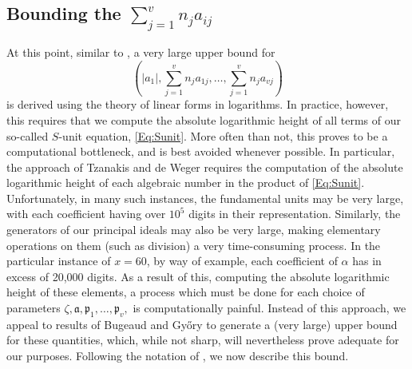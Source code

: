 \subsection{Bounding the $\sum_{j = 1}^v n_ja_{ij}$}

At this point, similar to \cite{TW3}, a very large upper bound for 
\[\left(|a_1|, \sum_{j = 1}^v n_ja_{1j}, \dots, \sum_{j = 1}^v n_ja_{vj}\right)\]
is derived using the theory of linear forms in logarithms. In practice, however, this requires that we compute the absolute logarithmic height of all terms of our so-called $S$-unit equation, \eqref{Eq:Sunit}. More often than not, this proves to be a computational bottleneck, and is best avoided whenever possible. In particular, the approach of Tzanakis and de Weger \cite{TW3}  requires the computation of the absolute logarithmic height of each algebraic number in the product of \eqref{Eq:Sunit}. Unfortunately, in many such instances, the fundamental units may be very large, with each coefficient having over $10^5$ digits in their representation. Similarly, the generators of our principal ideals may also be very large, making elementary operations on them (such as division) a very time-consuming process. In the particular instance of $x = 60$, by way of example, each coefficient of $\alpha$ has in excess of 20,000 digits. As a result of this, computing the absolute logarithmic height of these elements, a process which must be done for each choice of parameters $\zeta, \mathfrak{a}, \mathfrak{p}_1, \dots, \mathfrak{p}_v,$ is  computationally painful. Instead of this approach, we appeal to results of Bugeaud and Gy\H{o}ry  \cite{BugeaudGyory} to generate a (very large) upper bound for these quantities, which, while not sharp, will nevertheless prove adequate for our purposes. Following the notation of \cite{BugeaudGyory}, we now describe this bound.  


